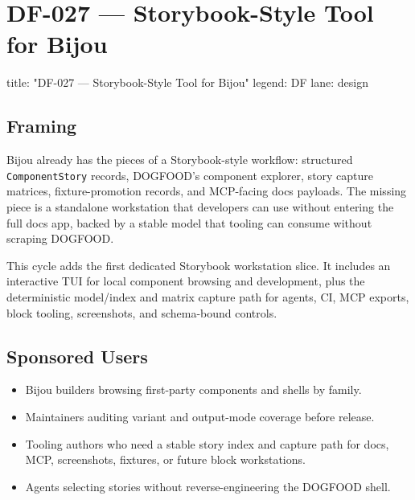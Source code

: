 \chapter{DF-027 --- Storybook-Style Tool for Bijou}\label{record-088}

\smallskip

\begin{RecordMeta}
title: "DF-027 — Storybook-Style Tool for Bijou"
legend: DF
lane: design

\end{RecordMeta}

\section{Framing}\label{record-088-framing}

Bijou already has the pieces of a Storybook-style workflow: structured \texttt{C\allowbreak{}o\allowbreak{}m\allowbreak{}p\allowbreak{}o\allowbreak{}n\allowbreak{}e\allowbreak{}n\allowbreak{}t\allowbreak{}S\allowbreak{}t\allowbreak{}o\allowbreak{}r\allowbreak{}y} records, DOGFOOD's component explorer, story capture matrices, fixture-promotion records, and MCP-facing docs payloads. The missing piece is a standalone workstation that developers can use without entering the full docs app, backed by a stable model that tooling can consume without scraping DOGFOOD.

This cycle adds the first dedicated Storybook workstation slice. It includes an interactive TUI for local component browsing and development, plus the deterministic model/index and matrix capture path for agents, CI, MCP exports, block tooling, screenshots, and schema-bound controls.

\section{Sponsored Users}\label{record-088-sponsored-users}

\begin{itemize}
\tightlist
\item
  Bijou builders browsing first-party components and shells by family.
\item
  Maintainers auditing variant and output-mode coverage before release.
\item
  Tooling authors who need a stable story index and capture path for docs, MCP, screenshots, fixtures, or future block workstations.
\item
  Agents selecting stories without reverse-engineering the DOGFOOD shell.
\end{itemize}

